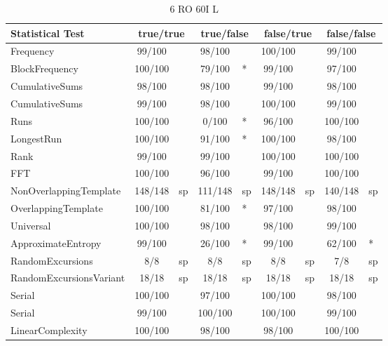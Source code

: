 \begin{table}[H]
\centering
\caption{6 RO 60I L}
\label{tab:nist_22_3RO_21I_L}
\begin{tabular}{|l|c|l|c|l|c|l|c|l|}
\hline
\textbf{Statistical Test} & \multicolumn{2}{c|}{\textbf{true/true}} & \multicolumn{2}{c|}{\textbf{true/false}} & \multicolumn{2}{c|}{\textbf{false/true}} & \multicolumn{2}{c|}{\textbf{false/false}} \\ \hline
Frequency               &  99/100 &     &  98/100 &     & 100/100 &     &  99/100 &     \\ \hline
BlockFrequency          & 100/100 &     &  79/100 & *   &  99/100 &     &  97/100 &     \\ \hline
CumulativeSums          &  98/100 &     &  98/100 &     &  99/100 &     &  98/100 &     \\ \hline
CumulativeSums          &  99/100 &     &  98/100 &     & 100/100 &     &  99/100 &     \\ \hline
Runs                    & 100/100 &     &   0/100 & *   &  96/100 &     & 100/100 &     \\ \hline
LongestRun              & 100/100 &     &  91/100 & *   & 100/100 &     &  98/100 &     \\ \hline
Rank                    &  99/100 &     &  99/100 &     & 100/100 &     & 100/100 &     \\ \hline
FFT                     & 100/100 &     &  96/100 &     &  99/100 &     & 100/100 &     \\ \hline
NonOverlappingTemplate  & 148/148 & sp  & 111/148 & sp  & 148/148 & sp  & 140/148 & sp  \\ \hline
OverlappingTemplate     & 100/100 &     &  81/100 & *   &  97/100 &     &  98/100 &     \\ \hline
Universal               & 100/100 &     &  98/100 &     &  98/100 &     &  99/100 &     \\ \hline
ApproximateEntropy      &  99/100 &     &  26/100 & *   &  99/100 &     &  62/100 & *   \\ \hline
RandomExcursions        &     8/8 & sp  &     8/8 & sp  &     8/8 & sp  &     7/8 & sp  \\ \hline
RandomExcursionsVariant &   18/18 & sp  &   18/18 & sp  &   18/18 & sp  &   18/18 & sp  \\ \hline
Serial                  & 100/100 &     &  97/100 &     & 100/100 &     &  98/100 &     \\ \hline
Serial                  &  99/100 &     & 100/100 &     & 100/100 &     &  99/100 &     \\ \hline
LinearComplexity        & 100/100 &     &  98/100 &     &  98/100 &     & 100/100 &     \\ \hline
\end{tabular}
\end{table}


